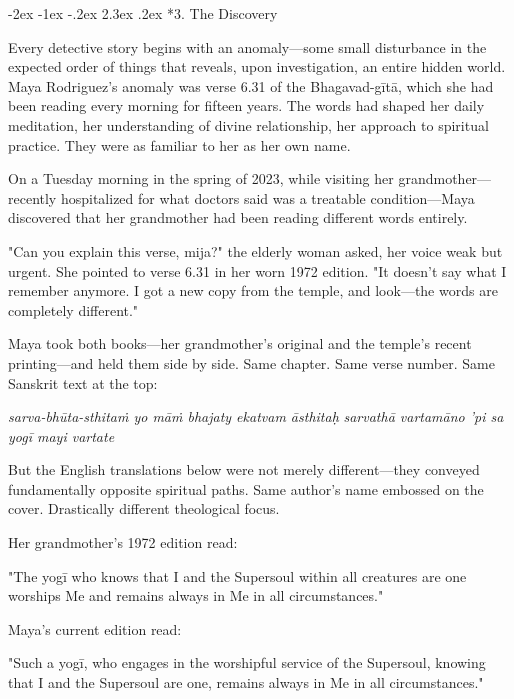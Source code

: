 \documentclass[12pt,twoside]{book}
\makeatletter
\def\cleardoublepage{\clearpage\if@twoside \ifodd\c@page\else\hbox{}\thispagestyle{empty}\newpage\if@twocolumn\hbox{}\newpage\fi\fi\fi}
\renewcommand\section{\@startsection{section}{1}{\z@}%
{-2ex \@plus -1ex \@minus -.2ex}%
{2.3ex \@plus.2ex}%
{\normalfont\Large\bfseries}}
\makeatother
\begin{document}
\cleardoublepage
\vspace*{0.20\textheight}
\section*{3. The Discovery}
\thispagestyle{chapterpage}

\normalfont\justifying
Every detective story begins with an anomaly—some small disturbance in the expected order of things that reveals, upon investigation, an entire hidden world. Maya Rodriguez's anomaly was verse 6.31 of the Bhagavad-gītā, which she had been reading every morning for fifteen years. The words had shaped her daily meditation, her understanding of divine relationship, her approach to spiritual practice. They were as familiar to her as her own name.

On a Tuesday morning in the spring of 2023, while visiting her grandmother—recently hospitalized for what doctors said was a treatable condition—Maya discovered that her grandmother had been reading different words entirely.

"Can you explain this verse, mija?" the elderly woman asked, her voice weak but urgent. She pointed to verse 6.31 in her worn 1972 edition. "It doesn't say what I remember anymore. I got a new copy from the temple, and look—the words are completely different."

Maya took both books—her grandmother's original and the temple's recent printing—and held them side by side. Same chapter. Same verse number. Same Sanskrit text at the top:

\emph{sarva-bhūta-sthitaṁ yo māṁ bhajaty ekatvam āsthitaḥ}
\emph{sarvathā vartamāno 'pi sa yogī mayi vartate}

But the English translations below were not merely different—they conveyed fundamentally opposite spiritual paths. Same author's name embossed on the cover. Drastically different theological focus.

Her grandmother's 1972 edition read:

"The yogī who knows that I and the Supersoul within all creatures are one worships Me and remains always in Me in all circumstances."

Maya's current edition read:

"Such a yogī, who engages in the worshipful service of the Supersoul, knowing that I and the Supersoul are one, remains always in Me in all circumstances."
\end{document}
